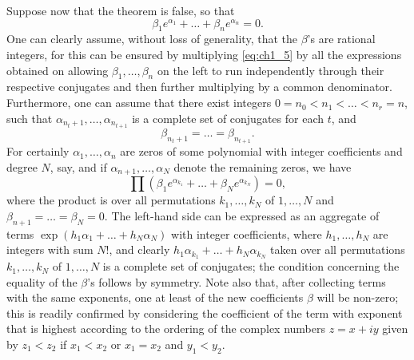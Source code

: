 Suppose now that the theorem is false, so that
\begin{equation} \label{eq:ch1_5}\tag{5}
\beta_1 e^{\alpha_1} + \dots + \beta_n e^{\alpha_n} = 0.
\end{equation}
One can clearly assume, without loss of generality, that the $\beta$'s are rational integers, for this can be ensured by multiplying \eqref{eq:ch1_5} by all the expressions obtained on allowing $\beta_1, \dots, \beta_n$ on the left to run independently through their respective conjugates and then further multiplying by a common denominator. Furthermore, one can assume that there exist integers $0 = n_0 < n_1 < \dots < n_r = n$, such that $\alpha_{n_t+1}, \dots, \alpha_{n_{t+1}}$ is a complete set of conjugates for each $t$, and
\[
\beta_{n_t+1} = \dots = \beta_{n_{t+1}}.
\]
For certainly $\alpha_1, \dots, \alpha_n$ are zeros of some polynomial with integer coefficients and degree $N$, say, and if $\alpha_{n+1}, \dots, \alpha_N$ denote the remaining zeros, we have
\[
\prod (\beta_1 e^{\alpha_{k_1}} + \dots + \beta_N e^{\alpha_{k_N}}) = 0,
\]
where the product is over all permutations $k_1, \dots, k_N$ of $1, \dots, N$ and $\beta_{n+1} = \dots = \beta_N = 0$. The left-hand side can be expressed as an aggregate of terms $\exp(h_1 \alpha_1 + \dots + h_N \alpha_N)$ with integer coefficients, where $h_1, \dots, h_N$ are integers with sum $N!$, and clearly $h_1 \alpha_{k_1} + \dots + h_N \alpha_{k_N}$ taken over all permutations $k_1, \dots, k_N$ of $1, \dots, N$ is a complete set of conjugates; the condition concerning the equality of the $\beta$'s follows by symmetry. Note also that, after collecting terms with the same exponents, one at least of the new coefficients $\beta$ will be non-zero; this is readily confirmed by considering the coefficient of the term with exponent that is highest according to the ordering of the complex numbers $z = x + iy$ given by $z_1 < z_2$ if $x_1 < x_2$ or $x_1 = x_2$ and $y_1 < y_2$.

